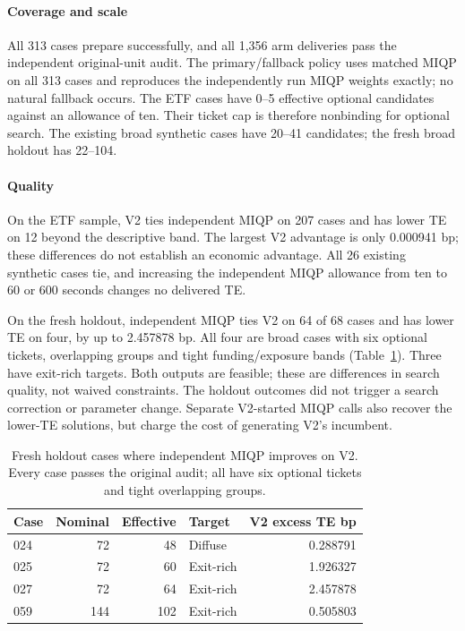 \paragraph{Coverage and scale}\label{sec:joint}\label{sec:breadth}
All 313 cases prepare successfully, and all 1,356 arm deliveries pass the
independent original-unit audit. The primary/fallback policy uses matched
MIQP on all 313 cases and reproduces the independently run MIQP weights
exactly; no natural fallback occurs. The ETF cases have 0--5 effective
optional candidates against an allowance of ten. Their ticket cap is
therefore nonbinding for optional search. The existing broad synthetic
cases have 20--41 candidates; the fresh broad holdout has 22--104.

\paragraph{Quality}
On the ETF sample, V2 ties independent MIQP on 207 cases and has lower TE
on 12 beyond the descriptive band. The largest V2 advantage is only
0.000941 bp; these differences do not establish an economic advantage.
All 26 existing synthetic cases tie, and increasing the independent
MIQP allowance from ten to 60 or 600 seconds changes no delivered TE.

On the fresh holdout, independent MIQP ties V2 on 64 of 68 cases and has
lower TE on four, by up to 2.457878 bp. All four are broad cases with six
optional tickets, overlapping groups and tight funding/exposure bands
(Table~\ref{tab:misses}). Three have exit-rich targets. Both outputs are
feasible; these are differences in search quality, not waived constraints.
The holdout outcomes did not trigger a search correction or parameter change.
Separate V2-started MIQP calls also recover the lower-TE solutions, but
charge the cost of generating V2's incumbent.

\begin{table}[htbp]\centering\small
\caption{Fresh holdout cases where independent MIQP improves on V2. Every case passes the original audit; all have six optional tickets and tight overlapping groups.}\label{tab:misses}
\begin{tabular}{lrrlr}\toprule
Case & Nominal & Effective & Target & V2 excess TE bp\\\midrule
024 & 72 & 48 & Diffuse & 0.288791\\
025 & 72 & 60 & Exit-rich & 1.926327\\
027 & 72 & 64 & Exit-rich & 2.457878\\
059 & 144 & 102 & Exit-rich & 0.505803\\
\bottomrule\end{tabular}\end{table}

